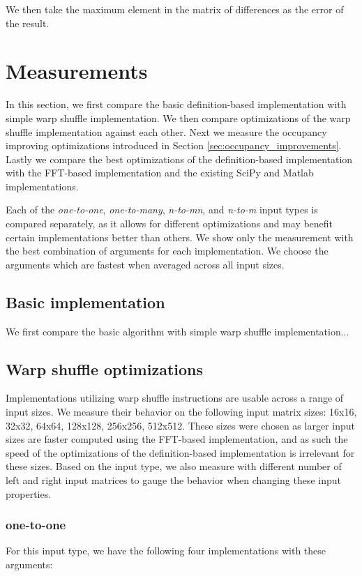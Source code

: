 We then take the maximum element in the matrix of differences as the error of the result.

\section{Measurements}

In this section, we first compare the basic definition-based implementation with simple warp shuffle implementation. We then compare optimizations of the warp shuffle implementation against each other. Next we measure the occupancy improving optimizations introduced in Section \ref{sec:occupancy_improvements}. Lastly we compare the best optimizations of the definition-based implementation with the FFT-based implementation and the existing SciPy and Matlab implementations.


Each of the \textit{one-to-one}, \textit{one-to-many}, \textit{n-to-mn}, and \textit{n-to-m} input types is compared separately, as it allows for different optimizations and may benefit certain implementations better than others. We show only the measurement with the best combination of arguments for each implementation. We choose the arguments which are fastest when averaged across all input sizes. %

\subsection{Basic implementation}

We first compare the basic algorithm with simple warp shuffle implementation...

\subsection{Warp shuffle optimizations}
\label{sec:results_warp_shuffle}

Implementations utilizing warp shuffle instructions are usable across a range of input sizes. We measure their behavior on the following input matrix sizes: 16x16, 32x32, 64x64, 128x128, 256x256, 512x512. These sizes were chosen as larger input sizes are faster computed using the FFT-based implementation, and as such the speed of the optimizations of the definition-based implementation is irrelevant for these sizes. Based on the input type, we also measure with different number of left and right input matrices to gauge the behavior when changing these input properties.

\subsubsection{one-to-one}
For this input type, we have the following four implementations with these arguments:

